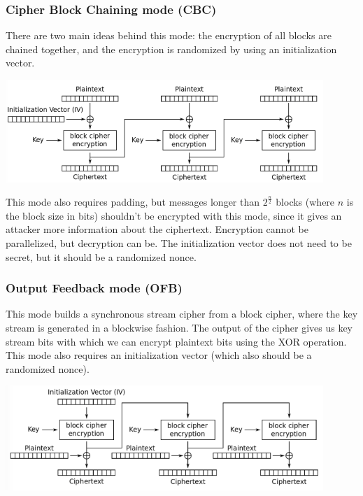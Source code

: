 \documentclass{math}
\begin{document}
\subsubsection*{Cipher Block Chaining mode (CBC)}
There are two main ideas behind this mode: the encryption of all blocks are
chained together, and the encryption is randomized by using an initialization
vector.
\begin{center}
  \includegraphics[width=12cm]{assets/cbc.png}
\end{center}
This mode also requires padding, but messages longer than \( 2^{\frac{n}{2}} \)
blocks (where \( n \) is the block size in bits) shouldn't be encrypted with
this mode, since it gives an attacker more information about the ciphertext.
Encryption cannot be parallelized, but decryption can be. The initialization
vector does not need to be secret, but it should be a randomized nonce.

\subsubsection*{Output Feedback mode (OFB)}
This mode builds a synchronous stream cipher from a block cipher, where the key
stream is generated in a blockwise fashion. The output of the cipher gives us
key stream bits with which we can encrypt plaintext bits using the XOR
operation. This mode also requires an initialization vector (which also should
be a randomized nonce).
\begin{center}
  \includegraphics[width=12cm]{assets/ofb.png}
\end{center}
\end{document}
